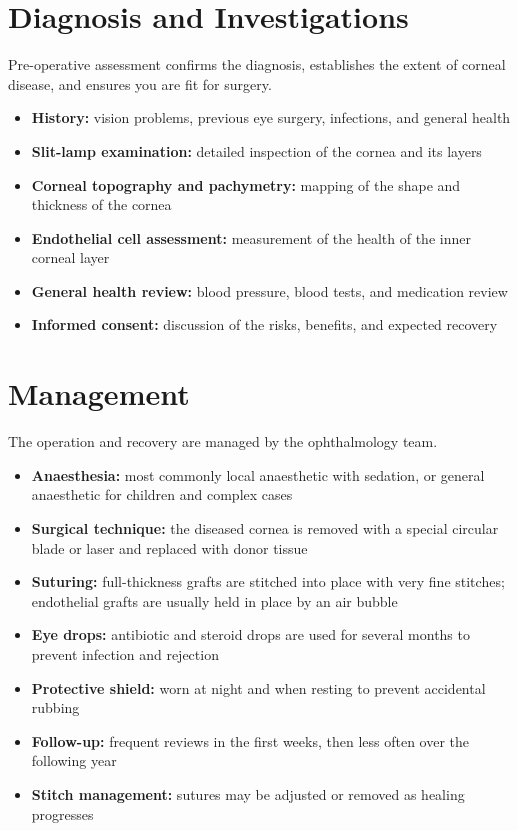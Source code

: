 \section*{Diagnosis and Investigations}
Pre-operative assessment confirms the diagnosis, establishes the extent of corneal disease, and ensures you are fit for surgery.

\begin{itemize}
    \item \textbf{History:} vision problems, previous eye surgery, infections, and general health
    \item \textbf{Slit-lamp examination:} detailed inspection of the cornea and its layers
    \item \textbf{Corneal topography and pachymetry:} mapping of the shape and thickness of the cornea
    \item \textbf{Endothelial cell assessment:} measurement of the health of the inner corneal layer
    \item \textbf{General health review:} blood pressure, blood tests, and medication review
    \item \textbf{Informed consent:} discussion of the risks, benefits, and expected recovery
\end{itemize}

\section*{Management}
The operation and recovery are managed by the ophthalmology team.

\begin{itemize}
    \item \textbf{Anaesthesia:} most commonly local anaesthetic with sedation, or general anaesthetic for children and complex cases
    \item \textbf{Surgical technique:} the diseased cornea is removed with a special circular blade or laser and replaced with donor tissue
    \item \textbf{Suturing:} full-thickness grafts are stitched into place with very fine stitches; endothelial grafts are usually held in place by an air bubble
    \item \textbf{Eye drops:} antibiotic and steroid drops are used for several months to prevent infection and rejection
    \item \textbf{Protective shield:} worn at night and when resting to prevent accidental rubbing
    \item \textbf{Follow-up:} frequent reviews in the first weeks, then less often over the following year
    \item \textbf{Stitch management:} sutures may be adjusted or removed as healing progresses
\end{itemize}

